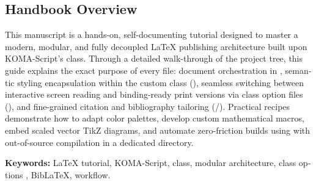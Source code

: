 \begin{otherlanguage}{english}
\section*{Handbook Overview}

This manuscript is a hands-on, self-documenting tutorial designed to master a modern, modular,
and fully decoupled \LaTeX{} publishing architecture built upon KOMA-Script's  class.
Through a detailed walk-through of the project tree, this guide explains the exact purpose of every file:
document orchestration in ,
semantic styling encapsulation within the custom class (),
seamless switching between interactive screen reading and binding-ready print versions via class option files (),
and fine-grained citation and bibliography tailoring (/).
Practical recipes demonstrate how to adapt color palettes, develop custom mathematical macros,
embed scaled vector TikZ diagrams, and automate zero-friction builds using  with out-of-source compilation in a dedicated directory.

\vspace{0.8em}
\noindent\textbf{Keywords:} \LaTeX{} tutorial, KOMA-Script,  class, modular architecture, class options , Bib\LaTeX{},  workflow.
\end{otherlanguage}
